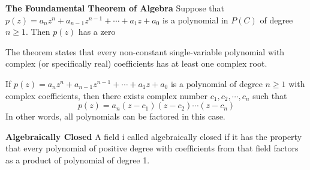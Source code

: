 \documentclass[11pt]{article}
\begin{document}
\begin{theorem*}
    \textbf{The Foundamental Theorem of Algebra} Suppose that $p(z) = a_n  z^n + a_{n-1} z^{n-1} + \cdots + a_1 z + a_0$ is a polynomial in $P(C)$ of degree $n\geq 1$. Then $p(z)$ has a zero 
    \begin{rem}
        The theorem states that every non-constant single-variable polynomial with complex (or specifically real) coefficients has at least one complex root.
    \end{rem}
\end{theorem*}


\begin{corollary*}
    If $p(z) = a_n  z^n + a_{n-1} z^{n-1} + \cdots + a_1 z + a_0$ is a polynomial of degree $n\geq 1$ with complex coefficients, then there exists complex number $c_1,c_2, \cdots, c_n$ such that 
    \[
        p(z) = a_n(z-c_1)(z-c_2)\cdots (z-c_n)    
    \]
    In other words, all polynomials can be factored in this case.
\end{corollary*}



\begin{defn*}
    \textbf{Algebraically Closed} A field i called algebraically closed if it has the property that every polynomial of positive degree with coefficients from that field factors as a product of polynomial of degree 1. 
\end{defn*}
\end{document}
